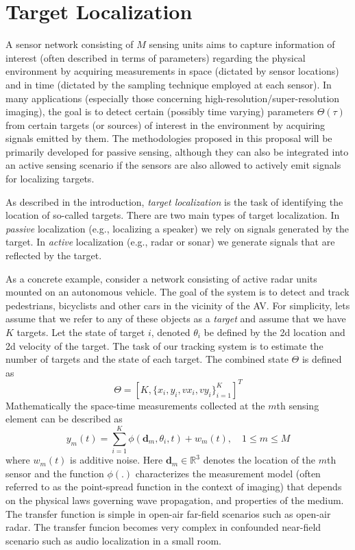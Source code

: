 \section{Target Localization}\label{sec:TL}

A sensor network consisting of $M$ sensing units aims to capture information of interest (often described in terms of parameters) regarding the physical environment by acquiring measurements in space (dictated by sensor locations) and in time (dictated by the sampling technique employed at each sensor). In many applications (especially those concerning high-resolution/super-resolution imaging), the goal is to detect certain (possibly time varying) parameters $\Theta(\tau)$ from certain targets (or sources) of interest in the environment by acquiring signals emitted by them. The methodologies proposed in this proposal will be primarily developed for passive sensing, although they can also be integrated into an active sensing scenario if the sensors are also allowed to actively emit signals for localizing targets.

As described in the introduction, {\em target localization} is the task of identifying the location of so-called targets. There are two main types of target localization. In {\em passive} localization (e.g., localizing a speaker) we rely on signals generated by the target.   In {\em active} localization (e.g., radar or sonar) we generate signals that are reflected by the target.

As a concrete example, consider a network consisting of active radar units mounted on an autonomous vehicle. The goal of the system is to detect and track pedestrians, bicyclists and other cars in the vicinity of the AV. For simplicity, lets assume that we refer to any of these objects as a {\em target} and assume that we have $K$ targets. Let the state of target $i$, denoted $\theta_i$ be defined by the 2d location and 2d velocity of the target. The task of our tracking system is to estimate the number of targets and the state of each target.
The combined state $\Theta$ is defined as 
\begin{equation} \Theta = [K, \{x_i, y_i, vx_i ,vy_i\}_{i=1}^K]^T 
\end{equation} 
Mathematically the space-time measurements collected at the $m$th sensing element can be described as 
\begin{equation} 
y_m (t) = \sum_{i=1}^{K} \phi (\mathbf{d}_m,\theta_i,t) + w_m(t), \quad 1\leq m\leq M 
\label{eqn:MeasMod}\end{equation}
where $w_m(t)$ is additive noise. Here $\mathbf{d}_m\in \mathbb{R}^3$ denotes the location of the $m$th sensor and the function $\phi(.)$ characterizes the measurement model (often referred to as the point-spread function in the context of imaging) that depends on the physical laws governing wave propagation, and properties of the medium. The transfer function is simple in open-air far-field scenarios such as open-air radar. The transfer funcion becomes very complex in confounded near-field scenario such as audio localization in a small room.


